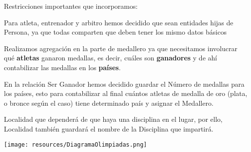 

Restricciones importantes que incorporamos:

Para atleta, entrenador y arbitro hemos decidido que sean entidades hijas de Persona, ya que todas comparten que deben tener los mismo datos básicos

Realizamos agregación en la parte de medallero ya que necesitamos involucrar qué \textbf{atletas} ganaron medallas, es decir, cuáles son \textbf{ganadores} y de ahí contabilizar las medallas en los \textbf{países}. 

En la relación Ser Ganador hemos decidido guardar el Número de medallas para los países, esto para contabilizar al final cuántos atletas de medalla de oro (plata, o bronce según el caso) tiene determinado país y asignar el Medallero.

Localidad que dependerá de que haya una disciplina en el lugar, por ello, Localidad también guardará el nombre de la Disciplina que impartirá.

\begin{center}
    \texttt{[image: resources/DiagramaOlimpiadas.png]}
\end{center}


